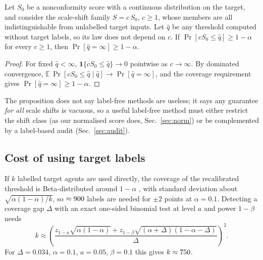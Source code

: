 \begin{proposition}\label{prop:ident}
Let $S_0$ be a nonconformity score with a continuous distribution on the target, and consider the scale-shift family
$S=c\,S_0$, $c\ge1$, whose members are all indistinguishable from unlabelled target inputs. Let $\hat q$ be any threshold
computed without target labels, so its law does not depend on $c$. If $\Pr[cS_0\le\hat q]\ge 1-\alpha$ for every $c\ge1$,
then $\Pr[\hat q=\infty]\ge 1-\alpha$.
\end{proposition}
\begin{proof}
For fixed $\hat q<\infty$, $\mathbf{1}\{cS_0\le\hat q\}\to 0$ pointwise as $c\to\infty$. By dominated convergence,
$\mathbb{E}\,\Pr[cS_0\le\hat q\mid \hat q]\to \Pr[\hat q=\infty]$, and the coverage requirement gives
$\Pr[\hat q=\infty]\ge 1-\alpha$.
\end{proof}
\begin{remark}
The proposition does not say label-free methods are useless; it says any guarantee \emph{for all} scale shifts is vacuous,
so a useful label-free method must either restrict the shift class (as our normalised score does, Sec.~\ref{sec:norm}) or
be complemented by a label-based audit (Sec.~\ref{sec:audit}).
\end{remark}

\subsection{Cost of using target labels}
If $k$ labelled target agents are used directly, the coverage of the recalibrated threshold is Beta-distributed around
$1-\alpha$ \cite{vovk2012conditional}, with standard deviation about $\sqrt{\alpha(1-\alpha)/k}$, so $\approx900$
labels are needed for $\pm 2$ points at $\alpha=0.1$.
Detecting a coverage gap $\Delta$ with an exact one-sided binomial test at level $a$ and power $1-\beta$ needs
\begin{equation}\label{eq:budget}
k\approx\left(\frac{z_{1-a}\sqrt{\alpha(1-\alpha)}+z_{1-\beta}\sqrt{(\alpha+\Delta)(1-\alpha-\Delta)}}{\Delta}\right)^{2}.
\end{equation}
For $\Delta=0.034$, $\alpha=0.1$, $a=0.05$, $\beta=0.1$ this gives $k\approx750$.
